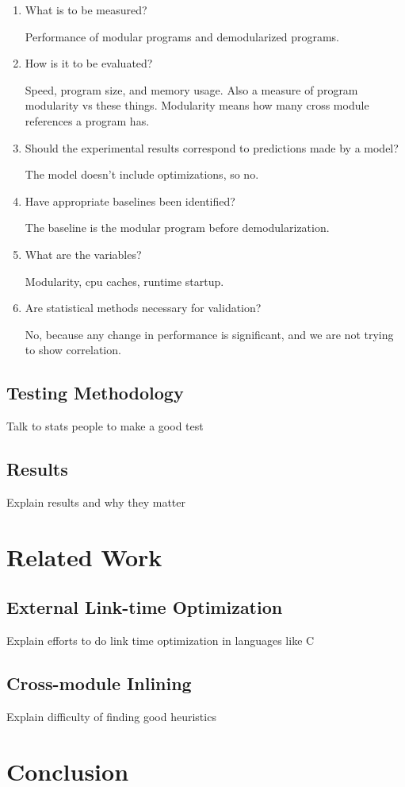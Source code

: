 \documentclass{llncs}
\begin{document}
   \begin{enumerate}

   \item What is to be measured?
   
   Performance of modular programs and demodularized programs.
  
   \item How is it to be evaluated?
   
   Speed, program size, and memory usage. Also a measure of program modularity vs these things. Modularity means how many cross module references a program has.

   \item Should the experimental results correspond to predictions made by a model?
 
   The model doesn't include optimizations, so no.

   \item Have appropriate baselines been identified?

   The baseline is the modular program before demodularization.

   \item What are the variables?

   Modularity, cpu caches, runtime startup.

   \item Are statistical methods necessary for validation?

   No, because any change in performance is significant, and we are not trying to show correlation.

   \end{enumerate}


   \subsection{Testing Methodology}

   Talk to stats people to make a good test
   
   \subsection{Results}

   Explain results and why they matter
\section{Related Work}
   \subsection{External Link-time Optimization}

   Explain efforts to do link time optimization in languages like C 
   
   \subsection{Cross-module Inlining}

   Explain difficulty of finding good heuristics

\section{Conclusion}
\end{document}
